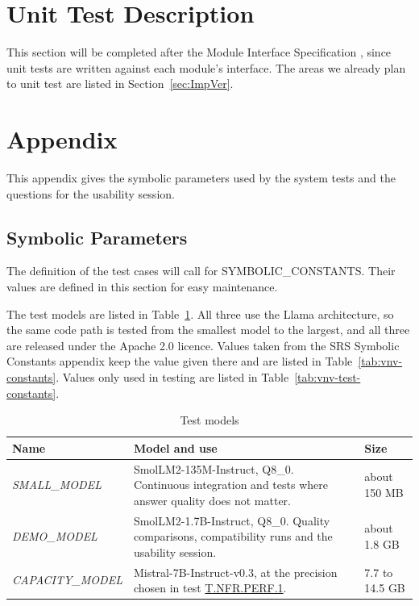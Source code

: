 \documentclass[12pt, titlepage]{article}
\begin{document}
\section{Unit Test Description}

This section will be completed after the Module Interface Specification
\citep{MIS}, since unit tests are written against each module's interface. The
areas we already plan to unit test are listed in Section~\ref{sec:ImpVer}.
				




\newpage

\section{Appendix}

This appendix gives the symbolic parameters used by the system tests and the
questions for the usability session.

\subsection{Symbolic Parameters}
\label{sec:symbolic-parameters}

The definition of the test cases will call for SYMBOLIC\_CONSTANTS.
Their values are defined in this section for easy maintenance.

The test models are listed in Table~\ref{tab:test-models}. All three use the
Llama architecture, so the same code path is tested from the smallest model to
the largest, and all three are released under the Apache 2.0 licence. Values
taken from the SRS Symbolic Constants appendix keep the value given there and
are listed in Table~\ref{tab:vnv-constants}. Values only used in testing are
listed in Table~\ref{tab:vnv-test-constants}.

\begin{table}[h]
\centering
\caption{Test models}
\label{tab:test-models}
\begin{tabularx}{\textwidth}{lXl}
\toprule
\textbf{Name} & \textbf{Model and use} & \textbf{Size} \\
\midrule
\textit{SMALL\_MODEL} & SmolLM2-135M-Instruct, Q8\_0. Continuous integration
  and tests where answer quality does not matter. & about 150 MB \\
\textit{DEMO\_MODEL} & SmolLM2-1.7B-Instruct, Q8\_0. Quality comparisons,
  compatibility runs and the usability session. & about 1.8 GB \\
\textit{CAPACITY\_MODEL} & Mistral-7B-Instruct-v0.3, at the precision chosen
  in test \hyperref[T.NFR.PERF.1]{T.NFR.PERF.1}. & 7.7 to 14.5 GB \\
\bottomrule
\end{tabularx}
\end{table}
\end{document}
